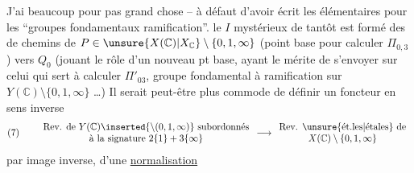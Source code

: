 J'ai beaucoup  pour pas grand chose -- à défaut d'avoir écrit les   élémentaires pour les ``groupes fondamentaux  ramification''.  le  $I$ mystérieux de tantôt est formé des  de chemins de $P\in\unsure{X(\mathbb C)|X_{\mathbb C}}\setminus\{0,1,\infty\}$ (point base pour calculer $\Pi_{0,3}$) vers $Q_0$ (jouant le rôle d'un nouveau pt base, ayant le mérite de s'envoyer sur celui  qui sert à calculer $\Pi'_{03}$, groupe fondamental à ramification sur $Y(\mathbb C)\setminus\{0,1,\infty\}$ \dots) Il serait peut-être plus commode de définir  un foncteur en sens inverse
\[
(7)\qquad
\begin{array}{c}
\text{Rev. de }Y(\mathbb C)\inserted{\setminus(0,1,\infty)}\ \text{subordonnés}\\
\text{à la signature }2\{1\}+3\{\infty\}
\end{array}
\longrightarrow
\begin{array}{c}
\text{Rev. \unsure{ét.les|étales} de}\\
X(\mathbb C)\setminus\{0,1,\infty\}
\end{array}
\]
par image inverse,  d'une \uline{normalisation}
